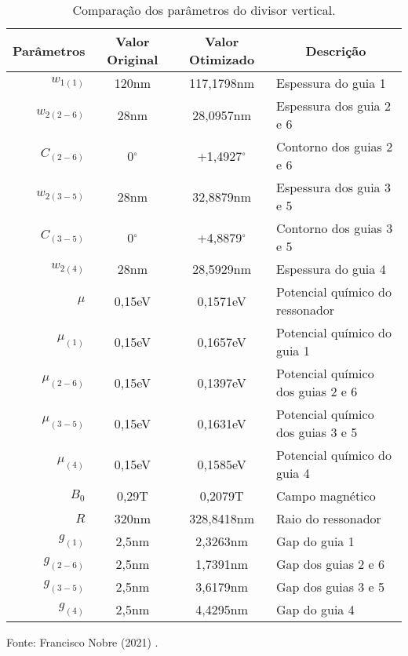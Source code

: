 



\begin{table}[H]
    \centering
    \caption{Comparação dos parâmetros do divisor vertical.}
    \begin{tabular}{rccl}
    \hline
\multicolumn{1}{c}{Parâmetros} & Valor Original & Valor Otimizado   & \multicolumn{1}{c}{Descrição}     \\ \hline
$w_{1(1)}$                     & 120nm          & 117,1798nm        & Espessura do guia 1               \\
$w_{2(2-6)}$                   & 28nm           & 28,0957nm         & Espessura dos guia 2 e 6          \\
$C_{(2-6)}$                    & 0$^{\circ}$    & +1,4927$^{\circ}$ & Contorno dos guias 2 e 6          \\
$w_{2(3-5)}$                   & 28nm           & 32,8879nm         & Espessura dos guia 3 e 5          \\
$C_{(3-5)}$                    & 0$^{\circ}$    & +4,8879$^{\circ}$ & Contorno dos guias 3 e 5          \\
$w_{2(4)}$                     & 28nm           & 28,5929nm         & Espessura do guia 4               \\
$\mu$                          & 0,15eV         & 0,1571eV          & Potencial químico do ressonador   \\
$\mu_{(1)}$                    & 0,15eV         & 0,1657eV          & Potencial químico do guia 1       \\
$\mu_{(2-6)}$                  & 0,15eV         & 0,1397eV          & Potencial químico dos guias 2 e 6 \\
$\mu_{(3-5)}$                  & 0,15eV         & 0,1631eV          & Potencial químico dos guias 3 e 5 \\
$\mu_{(4)}$                    & 0,15eV         & 0,1585eV          & Potencial químico do guia 4       \\
$B_{0}$                        & 0,29T          & 0,2079T           & Campo magnético                   \\
$R$                            & 320nm          & 328,8418nm        & Raio do ressonador                \\
$g_{(1)}$                      & 2,5nm          & 2,3263nm          & Gap do guia 1                     \\
$g_{(2-6)}$                    & 2,5nm          & 1,7391nm          & Gap dos guias 2 e 6               \\
$g_{(3-5)}$                    & 2,5nm          & 3,6179nm          & Gap dos guias 3 e 5               \\
$g_{(4)}$                      & 2,5nm          & 4,4295nm          & Gap do guia 4                     \\ \hline
\end{tabular}

    \label{tab: Vertical_Loop_131}

    \vspace{2.5mm}
    Fonte: Francisco Nobre (2021) \cite{Nobre2021Graphene}.

    \end{table}